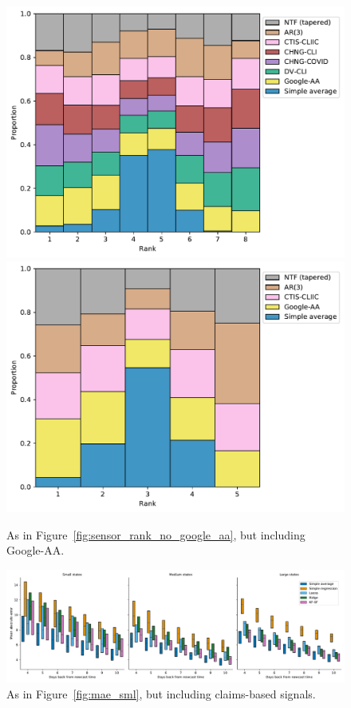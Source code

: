 \documentclass[sts]{imsart}
\theoremstyle{plain}
\theoremstyle{definition}
\theoremstyle{remark}
\begin{document}
\begin{appendix}
\begin{figure}[tb]
\centering
\includegraphics[width=0.825\linewidth]{./figures/rankplot_claims.pdf}
\includegraphics[width=0.825\linewidth]{./figures/rankplot_no_claims.pdf}
\caption{As in Figure~\ref{fig:sensor_rank_no_google_aa}, but including Google-AA.}
\label{fig:sensor_rank}
\end{figure}

\begin{figure}[tb]
\centering
\includegraphics[width=0.95\linewidth]{./figures/boxenplot_claims.pdf}
\caption{As in Figure~\ref{fig:mae_sml}, but including claims-based signals.}
\label{fig:mae_sml_claims}
\end{figure}


\end{appendix}
\end{document}
